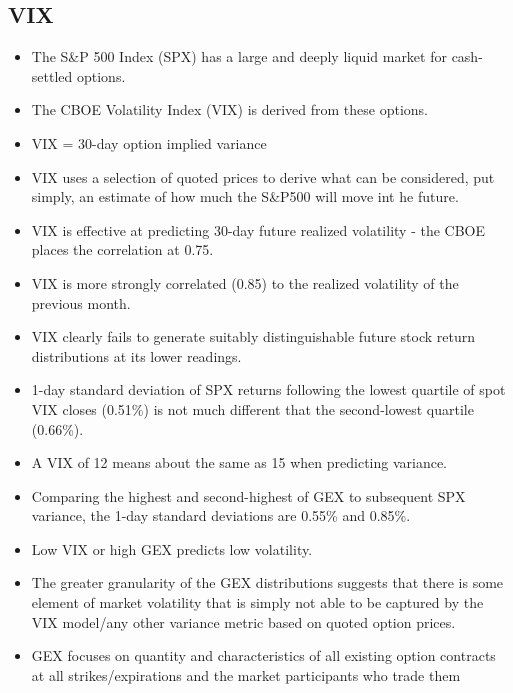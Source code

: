\documentclass[12pt, oneside]{article}
\begin{document}
\subsection{VIX}
\begin{itemize}
    \item The S\&P 500 Index (SPX) has a large and deeply liquid market for cash-settled options. 
    \item The CBOE Volatility Index (VIX) is derived from these options.
    \item VIX = 30-day option implied variance
    \item VIX uses a selection of quoted prices to derive what can be considered, put simply, an estimate of how much the S\&P500 will move int he future.
    \item VIX is effective at predicting 30-day future realized volatility - the CBOE places the correlation at 0.75. 
    \item VIX is more strongly correlated (0.85) to the realized volatility of the previous month. 
    \item VIX clearly fails to generate suitably distinguishable future stock return distributions at its lower readings.
    \item 1-day standard deviation of SPX returns following the lowest quartile of spot VIX closes (0.51\%) is not much different that the second-lowest quartile (0.66\%).
    \item A VIX of 12 means about the same as 15 when predicting variance.
    \item Comparing the highest and second-highest of GEX to subsequent SPX variance, the 1-day standard deviations are 0.55\% and 0.85\%. 
    \item Low VIX or high GEX predicts low volatility.
    \item The greater granularity of the GEX distributions suggests that there is some element of market volatility that is simply not able to be captured by the VIX model/any other variance metric based on quoted option prices.
    \item GEX focuses on quantity and characteristics of all existing option contracts at all strikes/expirations and the market participants who trade them
\end{itemize}
\end{document}

